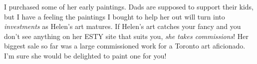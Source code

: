 I purchased some of her early paintings. Dads are supposed to support
their kids, but I have a feeling the paintings I bought to help her out
will turn into \emph{investments} as Helen's art matures. If Helen's art
catches your fancy and you don't see anything on her ESTY site that
suits you, \emph{she takes commissions}! Her biggest sale so far was a
large commissioned work for a Toronto art aficionado. I'm sure she would
be delighted to paint one for you!





%
 


